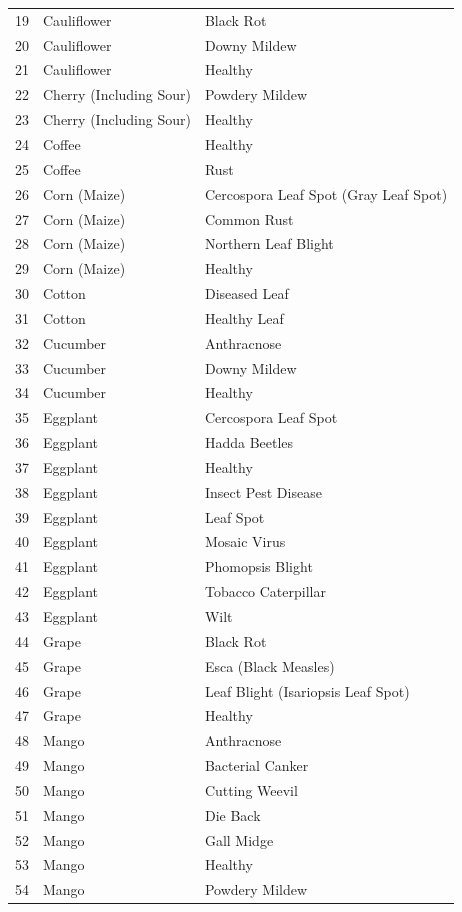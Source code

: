 \begin{longtable}{@{}C{1.6cm} L{4.2cm} L{8.1cm}@{}}
19 & Cauliflower & Black Rot \\
20 & Cauliflower & Downy Mildew \\
21 & Cauliflower & Healthy \\
22 & Cherry (Including Sour) & Powdery Mildew \\
23 & Cherry (Including Sour) & Healthy \\
24 & Coffee & Healthy \\
25 & Coffee & Rust \\
26 & Corn (Maize) & Cercospora Leaf Spot (Gray Leaf Spot) \\
27 & Corn (Maize) & Common Rust \\
28 & Corn (Maize) & Northern Leaf Blight \\
29 & Corn (Maize) & Healthy \\
30 & Cotton & Diseased Leaf \\
31 & Cotton & Healthy Leaf \\
32 & Cucumber & Anthracnose \\
33 & Cucumber & Downy Mildew \\
34 & Cucumber & Healthy \\
35 & Eggplant & Cercospora Leaf Spot \\
36 & Eggplant & Hadda Beetles \\
37 & Eggplant & Healthy \\
38 & Eggplant & Insect Pest Disease \\
39 & Eggplant & Leaf Spot \\
40 & Eggplant & Mosaic Virus \\
41 & Eggplant & Phomopsis Blight \\
42 & Eggplant & Tobacco Caterpillar \\
43 & Eggplant & Wilt \\
44 & Grape & Black Rot \\
45 & Grape & Esca (Black Measles) \\
46 & Grape & Leaf Blight (Isariopsis Leaf Spot) \\
47 & Grape & Healthy \\
48 & Mango & Anthracnose \\
49 & Mango & Bacterial Canker \\
50 & Mango & Cutting Weevil \\
51 & Mango & Die Back \\
52 & Mango & Gall Midge \\
53 & Mango & Healthy \\
54 & Mango & Powdery Mildew \\

\end{longtable}
